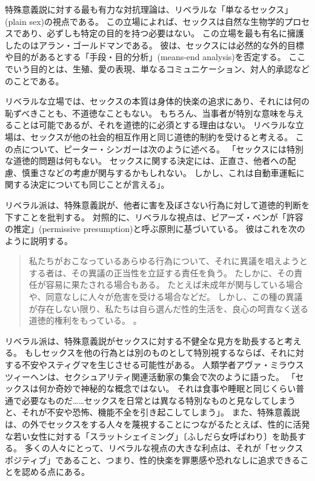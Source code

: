 \documentclass[paper=a4,book,openany]{jlreq} \usepackage{mystyle}
\begin{document}
特殊意義説に対する最も有力な対抗理論は、リベラルな「単なるセックス」(plain sex)の視点である。
この立場によれば、セックスは自然な生物学的プロセスであり、必ずしも特定の目的を持つ必要はない。
この立場を最も有名に擁護したのはアラン・ゴールドマンである。
彼は、セックスには必然的な外的目標や目的があるとする「手段・目的分析」(means-end analysis)を否定する。
ここでいう目的とは、生殖、愛の表現、単なるコミュニケーション、対人的承認などのことである\citep{goldman77:_plain_sex}。

リベラルな立場では、セックスの本質は身体的快楽の追求にあり、それには何の恥ずべきことも、不道徳なこともない。
もちろん、当事者が特別な意味を与えることは可能であるが、それを道徳的に必須とする理由はない。
リベラルな立場は、セックスが他の社会的相互作用と同じ道徳的制約を受けると考える。
この点について、ピーター・シンガーは次のように述べる。
「セックスには特別な道徳的問題は何もない。
セックスに関する決定には、正直さ、他者への配慮、慎重さなどの考慮が関与するかもしれない。
しかし、これは自動車運転に関する決定についても同じことが言える」\citep[p.2]{singer79:_pract_ethic}。

リベラル派は、特殊意義説が、他者に害を及ぼさない行為に対して道徳的判断を下すことを批判する。
対照的に、リベラルな視点は、ピアーズ・ベンが「許容の推定」(permissive presumption)と呼ぶ原則に基づいている。
彼はこれを次のように説明する。
\begin{quote}
  私たちがおこなっているあらゆる行為について、それに異議を唱えようとする者は、その異議の正当性を立証する責任を負う。
たしかに、その責任が容易に果たされる場合もある。
たとえば未成年が関与している場合や、同意なしに人々が危害を受ける場合などだ。
しかし、この種の異議が存在しない限り、私たちは自ら選んだ性的生活を、良心の呵責なく送る道徳的権利をもっている。
\citep[p. 237]{benn99:_is_sex_moral_special}。
\end{quote}
リベラル派は、特殊意義説がセックスに対する不健全な見方を助長すると考える。
もしセックスを他の行為とは別のものとして特別視するならば、それに対する不安やスティグマを生じさせる可能性がある。
人類学者アヴァ・ミラウスツィーヘンは、セクシュアリティ関連活動家の集会で次のように語った。
「セックスは何か奇妙で神秘的な概念ではない。
それは食事や睡眠と同じくらい普通で必要なものだ……セックスを日常とは異なる特別なものと見なしてしまうと、それが不安や恐怖、機能不全を引き起こしてしまう」\citep{fein13:_why_sex_is}。
また、特殊意義説は、の外でセックスをする人々を蔑視することにつながる{\DDASH}たとえば、性的に活発な若い女性に対する「スラットシェイミング」〔ふしだら女呼ばわり〕を助長する。
多くの人々にとって、リベラルな視点の大きな利点は、それが「セックスポジティブ」であること、つまり、性的快楽を罪悪感や恐れなしに追求できることを認める点にある。
\end{document}
